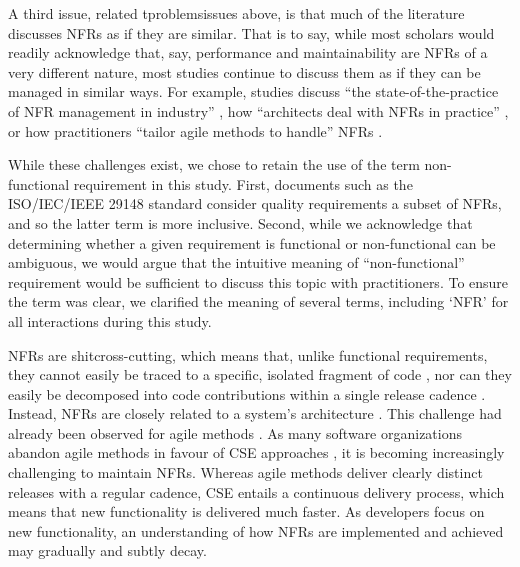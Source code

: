 \documentclass[smallextended]{svjour3}
\begin{document}
A third issue, related tproblemsissues above, is that much of the literature discusses NFRs as if they are similar. That is to say, while most scholars would readily acknowledge that, say, performance and maintainability are NFRs of a very different nature, most studies continue to discuss them as if they can be managed in similar ways. 
For example, studies discuss ``the state-of-the-practice of NFR management in industry'' \citep{borg2003bad}, how ``architects deal with NFRs in practice'' \citep{ameller_how_2012}, or how practitioners ``tailor agile methods to handle'' NFRs \citep{rahy2022managing}. 

While these challenges exist, we chose to retain the use of the term non-functional requirement in this study.
First, documents such as the ISO/IEC/IEEE 29148 standard consider quality requirements a subset of NFRs, and so the latter term is more inclusive. Second, while we acknowledge that determining whether a given requirement is functional or non-functional can be ambiguous, we would argue that the intuitive meaning of ``non-functional'' requirement would be sufficient to discuss this topic with practitioners. To ensure the term was clear, we clarified the meaning of several terms, including `NFR' for all interactions during this study. 




NFRs are shitcross-cutting, which means that, unlike functional requirements, they cannot easily be traced to a specific, isolated fragment of code \citep{bellomo_evolutionary_2014,glinz_non-functional_2007}, nor can they easily be decomposed into code contributions within a single release cadence \citep{bellomo_evolutionary_2014}. Instead, NFRs are closely related to a system's architecture \citep{harrison2007leveraging,garlan1995software}. 
This challenge had already been observed for agile methods \citep{nasir2023exploratory,rahy2022managing,behutiye2020management}.
As many software organizations abandon agile methods in favour of CSE approaches \citep{bosch2014continuous, fitzgerald2017continuous, olsson2014towards}, it is becoming increasingly challenging to maintain NFRs. Whereas agile methods deliver clearly distinct releases with a regular cadence, CSE entails a continuous delivery process, which means that new functionality is delivered much faster. As developers focus on new functionality, an understanding of how NFRs are implemented and achieved may gradually and subtly decay. 
\end{document}
